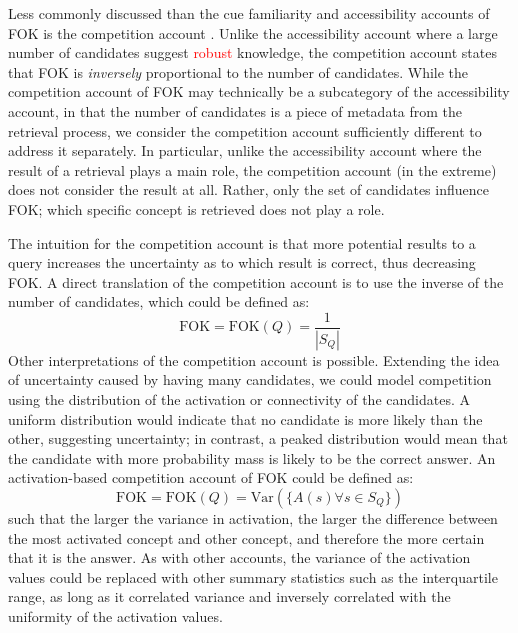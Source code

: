 \documentclass[10pt,letterpaper]{article}
\newcommand{\fixme}[2][]{#2}
\renewcommand{\fixme}[2][]{\textcolor{red}{#2}}
\newcommand{\fok}[0]{\text{FOK}}
\begin{document}
Less commonly discussed than the cue familiarity and accessibility accounts of FOK is the competition account \cite{Schreiber1998TheRelationBetween}.
Unlike the accessibility account where a large number of candidates suggest \fixme{robust} knowledge, the competition account states that FOK is \textit{inversely} proportional to the number of candidates.
While the competition account of FOK may technically be a subcategory of the accessibility account, in that the number of candidates is a piece of metadata from the retrieval process, we consider the competition account sufficiently different to address it separately.
In particular, unlike the accessibility account where the result of a retrieval plays a main role, the competition account (in the extreme) does not consider the result at all.
Rather, only the set of candidates influence FOK; which specific concept is retrieved does not play a role.

The intuition for the competition account is that more potential results to a query increases the uncertainty as to which result is correct, thus decreasing FOK.
A direct translation of the competition account is to use the inverse of the number of candidates, which could be defined as:
$$\fok = \fok(Q) = \frac{1}{|S_Q|}$$
Other interpretations of the competition account is possible.
Extending the idea of uncertainty caused by having many candidates, we could model competition using the distribution of the activation or connectivity of the candidates.
A uniform distribution would indicate that no candidate is more likely than the other, suggesting uncertainty; in contrast, a peaked distribution would mean that the candidate with more probability mass is likely to be the correct answer.
An activation-based competition account of FOK could be defined as:
$$\fok = \fok(Q) = \text{Var}(\{A(s) \forall s \in S_Q\})$$ %
such that the larger the variance in activation, the larger the difference between the most activated concept and other concept, and therefore the more certain that it is the answer.
As with other accounts, the variance of the activation values could be replaced with other summary statistics such as the interquartile range, as long as it correlated variance and inversely correlated with the uniformity of the activation values.
\end{document}
